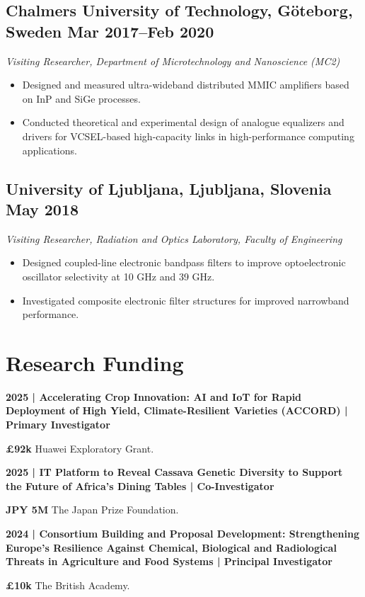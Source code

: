 \documentclass[a4paper,11pt]{article}
\newcommand{\role}[3]{%
    \subsection*{#1 \hfill \normalfont #2}
    \vspace{-0.5mm}
    {\itshape #3}
    \vspace{2mm}
}
\newcommand{\funding}[2]{%
    \vspace{2pt}
    \noindent\textbf{#1}\par
    \vspace{1pt}
    #2\par
    \vspace{5pt}
}
\begin{document}
\role
{Chalmers University of Technology, G\"oteborg, Sweden}
{Mar 2017--Feb 2020}
{Visiting Researcher, Department of Microtechnology and Nanoscience (MC2)}

\begin{itemize}
    \item Designed and measured ultra-wideband distributed MMIC amplifiers based on InP and SiGe processes.
    \item Conducted theoretical and experimental design of analogue equalizers and drivers for VCSEL-based high-capacity links in high-performance computing applications.
\end{itemize}

\role
{University of Ljubljana, Ljubljana, Slovenia}
{May 2018}
{Visiting Researcher, Radiation and Optics Laboratory, Faculty of Engineering}

\begin{itemize}
    \item Designed coupled-line electronic bandpass filters to improve optoelectronic oscillator selectivity at 10 GHz and 39 GHz.
    \item Investigated composite electronic filter structures for improved narrowband performance.
\end{itemize}


\section{Research Funding}

\funding
{2025 | Accelerating Crop Innovation: AI and IoT for Rapid Deployment of High Yield, Climate-Resilient Varieties (ACCORD) | \textbf{Primary Investigator}}
{\textbf{\pounds92k} Huawei Exploratory Grant.}

\funding
{2025 | IT Platform to Reveal Cassava Genetic Diversity to Support the Future of Africa's Dining Tables | \textbf{Co-Investigator}}
{\textbf{JPY 5M} The Japan Prize Foundation.}

\funding
{2024 | Consortium Building and Proposal Development: Strengthening Europe's Resilience Against Chemical, Biological and Radiological Threats in Agriculture and Food Systems | \textbf{Principal Investigator}}
{\textbf{\pounds10k} The British Academy.}
\end{document}
